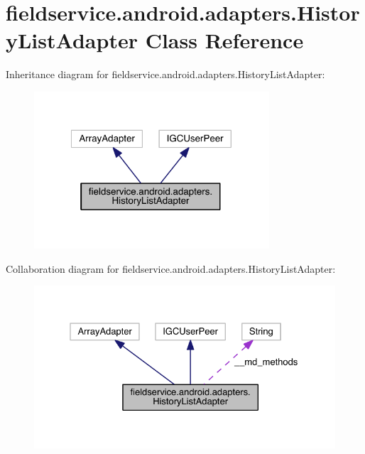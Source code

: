 \hypertarget{classfieldservice_1_1android_1_1adapters_1_1_history_list_adapter}{\section{fieldservice.\+android.\+adapters.\+History\+List\+Adapter Class Reference}
\label{classfieldservice_1_1android_1_1adapters_1_1_history_list_adapter}
}


Inheritance diagram for fieldservice.\+android.\+adapters.\+History\+List\+Adapter\+:
\nopagebreak
\begin{figure}[H]
\begin{center}
\leavevmode
\includegraphics[width=248pt]{classfieldservice_1_1android_1_1adapters_1_1_history_list_adapter__inherit__graph}
\end{center}
\end{figure}


Collaboration diagram for fieldservice.\+android.\+adapters.\+History\+List\+Adapter\+:
\nopagebreak
\begin{figure}[H]
\begin{center}
\leavevmode
\includegraphics[width=327pt]{classfieldservice_1_1android_1_1adapters_1_1_history_list_adapter__coll__graph}
\end{center}
\end{figure}
